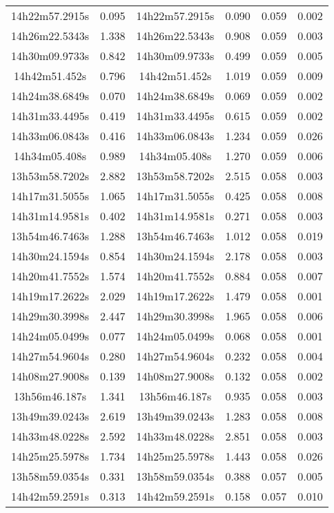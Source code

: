 \begin{table}
\begin{tabular}{cccccc}
14h22m57.2915s & 0.095 & 14h22m57.2915s & 0.090 & 0.059 & 0.002 \\
14h26m22.5343s & 1.338 & 14h26m22.5343s & 0.908 & 0.059 & 0.003 \\
14h30m09.9733s & 0.842 & 14h30m09.9733s & 0.499 & 0.059 & 0.005 \\
14h42m51.452s & 0.796 & 14h42m51.452s & 1.019 & 0.059 & 0.009 \\
14h24m38.6849s & 0.070 & 14h24m38.6849s & 0.069 & 0.059 & 0.002 \\
14h31m33.4495s & 0.419 & 14h31m33.4495s & 0.615 & 0.059 & 0.002 \\
14h33m06.0843s & 0.416 & 14h33m06.0843s & 1.234 & 0.059 & 0.026 \\
14h34m05.408s & 0.989 & 14h34m05.408s & 1.270 & 0.059 & 0.006 \\
13h53m58.7202s & 2.882 & 13h53m58.7202s & 2.515 & 0.058 & 0.003 \\
14h17m31.5055s & 1.065 & 14h17m31.5055s & 0.425 & 0.058 & 0.008 \\
14h31m14.9581s & 0.402 & 14h31m14.9581s & 0.271 & 0.058 & 0.003 \\
13h54m46.7463s & 1.288 & 13h54m46.7463s & 1.012 & 0.058 & 0.019 \\
14h30m24.1594s & 0.854 & 14h30m24.1594s & 2.178 & 0.058 & 0.003 \\
14h20m41.7552s & 1.574 & 14h20m41.7552s & 0.884 & 0.058 & 0.007 \\
14h19m17.2622s & 2.029 & 14h19m17.2622s & 1.479 & 0.058 & 0.001 \\
14h29m30.3998s & 2.447 & 14h29m30.3998s & 1.965 & 0.058 & 0.006 \\
14h24m05.0499s & 0.077 & 14h24m05.0499s & 0.068 & 0.058 & 0.001 \\
14h27m54.9604s & 0.280 & 14h27m54.9604s & 0.232 & 0.058 & 0.004 \\
14h08m27.9008s & 0.139 & 14h08m27.9008s & 0.132 & 0.058 & 0.002 \\
13h56m46.187s & 1.341 & 13h56m46.187s & 0.935 & 0.058 & 0.003 \\
13h49m39.0243s & 2.619 & 13h49m39.0243s & 1.283 & 0.058 & 0.008 \\
14h33m48.0228s & 2.592 & 14h33m48.0228s & 2.851 & 0.058 & 0.003 \\
14h25m25.5978s & 1.734 & 14h25m25.5978s & 1.443 & 0.058 & 0.026 \\
13h58m59.0354s & 0.331 & 13h58m59.0354s & 0.388 & 0.057 & 0.005 \\
14h42m59.2591s & 0.313 & 14h42m59.2591s & 0.158 & 0.057 & 0.010 \\

\end{tabular}
\end{table}
